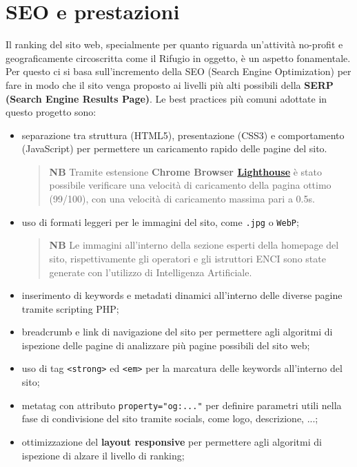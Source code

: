 \documentclass[a4paper,10pt]{article}
\begin{document}
	\section{SEO e prestazioni}
	Il ranking del sito web, specialmente per quanto riguarda un'attività no-profit e geograficamente circoscritta come il Rifugio in oggetto, è un aspetto fonamentale. Per questo ci si basa sull'incremento della SEO (Search Engine Optimization) per fare in modo che il sito venga proposto ai livelli più alti possibili della \textbf{SERP (Search Engine Results Page)}. Le best practices più comuni adottate in questo progetto sono:
	\begin{itemize}
		\item separazione tra struttura (HTML5), presentazione (CSS3) e comportamento (JavaScript) per permettere un caricamento rapido delle pagine del sito.
		\begin{quote}
			\textbf{NB} Tramite estensione \textbf{Chrome Browser \href{https://chromewebstore.google.com/detail/lighthouse/blipmdconlkpinefehnmjammfjpmpbjk?hl=it}{Lighthouse}} è stato possibile verificare una velocità di caricamento della pagina ottimo (99/100), con una velocità di caricamento massima pari a 0.5s.
		\end{quote}
		\item uso di formati leggeri per le immagini del sito, come \texttt{.jpg} o \texttt{WebP};
		\begin{quote}
			\textbf{NB} Le immagini all'interno della sezione esperti della homepage del sito, rispettivamente gli operatori e gli istruttori ENCI sono state generate con l'utilizzo di Intelligenza Artificiale.
		\end{quote}
		\item inserimento di keywords e metadati dinamici all'interno delle diverse pagine tramite scripting PHP;
		\item breadcrumb e link di navigazione del sito per permettere agli algoritmi di ispezione delle pagine di analizzare più pagine possibili del sito web;
		\item uso di tag \texttt{<strong>} ed \texttt{<em>} per la marcatura delle keywords all'interno del sito;
		\item metatag con attributo \texttt{property="og:..."} per definire parametri utili nella fase di condivisione del sito tramite socials, come logo, descrizione, ...;
		\item ottimizzazione del \textbf{layout responsive} per permettere agli algoritmi di ispezione di alzare il livello di ranking;

\end{itemize}
\end{document}
